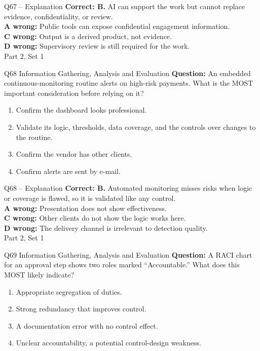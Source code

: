 \documentclass[aspectratio=169,10pt]{beamer}
\begin{document}
\begin{frame}[t]{Q67 -- Explanation}
	\footnotesize
	\textbf{Correct: B.} AI can support the work but cannot replace evidence, confidentiality, or review. \\[5pt]
\textbf{A wrong:} Public tools can expose confidential engagement information. \\[3pt]
\textbf{C wrong:} Output is a derived product, not evidence. \\[3pt]
\textbf{D wrong:} Supervisory review is still required for the work. \\[3pt]
	\vfill {\tiny Part 2, Set 1}
\end{frame}
\begin{frame}[t]{Q68 \hfill {\scriptsize Information Gathering, Analysis and Evaluation}}
	\small
	\textbf{Question:} An embedded continuous-monitoring routine alerts on high-risk payments. What is the MOST important consideration before relying on it?
	\begin{enumerate}[label=\Alph*.,itemsep=1pt,topsep=3pt]
			\item Confirm the dashboard looks professional.
			\item Validate its logic, thresholds, data coverage, and the controls over changes to the routine.
			\item Confirm the vendor has other clients.
			\item Confirm alerts are sent by e-mail.
	\end{enumerate}
\end{frame}
\begin{frame}[t]{Q68 -- Explanation}
	\footnotesize
	\textbf{Correct: B.} Automated monitoring misses risks when logic or coverage is flawed, so it is validated like any control. \\[5pt]
\textbf{A wrong:} Presentation does not show effectiveness. \\[3pt]
\textbf{C wrong:} Other clients do not show the logic works here. \\[3pt]
\textbf{D wrong:} The delivery channel is irrelevant to detection quality. \\[3pt]
	\vfill {\tiny Part 2, Set 1}
\end{frame}
\begin{frame}[t]{Q69 \hfill {\scriptsize Information Gathering, Analysis and Evaluation}}
	\small
	\textbf{Question:} A RACI chart for an approval step shows two roles marked ``Accountable.'' What does this MOST likely indicate?
	\begin{enumerate}[label=\Alph*.,itemsep=1pt,topsep=3pt]
			\item Appropriate segregation of duties.
			\item Strong redundancy that improves control.
			\item A documentation error with no control effect.
			\item Unclear accountability, a potential control-design weakness.
	\end{enumerate}
\end{frame}
\end{document}
